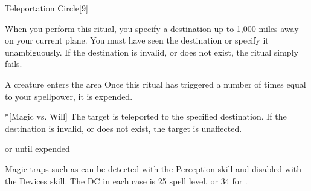 \begin{spellsection}{Teleportation Circle}[9]
    \begin{spellheader}
    \end{spellheader}
    \begin{spellcontent}
        \begin{spelltargetinginfo}
        \end{spelltargetinginfo}
        \begin{spelleffects}

            \spellspecial When you perform this ritual, you specify a destination up to 1,000 miles away on your current plane. You must have seen the destination or specify it unambiguously. If the destination is invalid, or does not exist, the ritual simply fails.
            \begin{spelltrigger}{A creature enters the area}
                \spellspecial Once this ritual has triggered a number of times equal to your spellpower, it is expended.
                \begin{spelltarget}*[Magic vs. Will]
                    \spelleffect The target is teleported to the specified destination. If the destination is invalid, or does not exist, the target is unaffected.
                \end{spelltarget}
            \end{spelltrigger}

            \spelldur \durext or until expended \dismissable
        \end{spelleffects}
    \end{spellcontent}
    \begin{spellfooter}
        \spellnotes Magic traps such as  can be detected with the Perception skill and disabled with the Devices skill. The DC in each case is 25 \add spell level, or 34 for .
    \end{spellfooter}
\end{spellsection}

